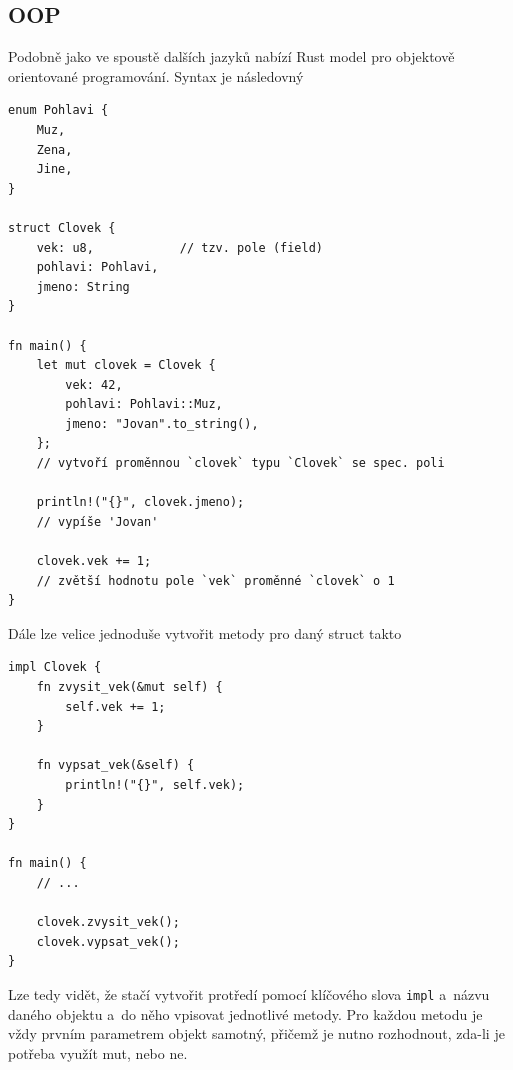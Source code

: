 \documentclass[a4paper, 12pt]{article} %
\newcommand{\rust}[1]{\texttt{#1}}
\begin{document}
	\subsection{OOP}
		Podobně jako ve spoustě dalších jazyků nabízí Rust model pro objektově orientované programování. Syntax je následovný
		\begin{verbatim}
enum Pohlavi {
	Muz,
	Zena,
	Jine,
}

struct Clovek {
	vek: u8,            // tzv. pole (field)
	pohlavi: Pohlavi,
	jmeno: String
}

fn main() {
	let mut clovek = Clovek {
		vek: 42,
		pohlavi: Pohlavi::Muz,
		jmeno: "Jovan".to_string(),
	};
	// vytvoří proměnnou `clovek` typu `Clovek` se spec. poli

	println!("{}", clovek.jmeno);
	// vypíše 'Jovan'
	
	clovek.vek += 1;
	// zvětší hodnotu pole `vek` proměnné `clovek` o 1
}
		\end{verbatim}
		
		Dále lze velice jednoduše vytvořit metody pro daný struct takto
		\begin{verbatim}
impl Clovek {
	fn zvysit_vek(&mut self) {
		self.vek += 1;
	}
	
	fn vypsat_vek(&self) {
		println!("{}", self.vek);
	}
}

fn main() {
	// ...

	clovek.zvysit_vek();
	clovek.vypsat_vek();
}
		\end{verbatim}
		
		Lze tedy vidět, že stačí vytvořit protředí pomocí klíčového slova \rust{impl} a~názvu daného objektu a~do něho vpisovat jednotlivé metody. Pro každou metodu je vždy prvním parametrem objekt samotný, přičemž je nutno rozhodnout, zda-li je potřeba využít mut, nebo ne.
		
\end{document}
